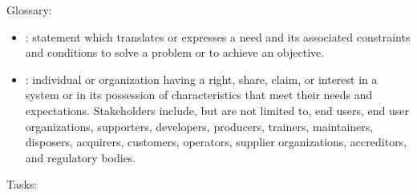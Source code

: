 Glossary:
\begin{itemize}
  \item
    : statement which translates or expresses a need and its associated constraints and conditions
     to solve a problem or to achieve an objective.
%
%
\item
  : individual or organization having a right, share, claim, or interest in
  a system or in its possession of characteristics that meet their needs and expectations.
 Stakeholders include, but are not limited to, end users, end user organizations, supporters, developers,
producers, trainers, maintainers, disposers, acquirers, customers, operators, supplier organizations, accreditors, and
regulatory bodies.

%
%
%
\end{itemize}
\newslide
Tasks:
